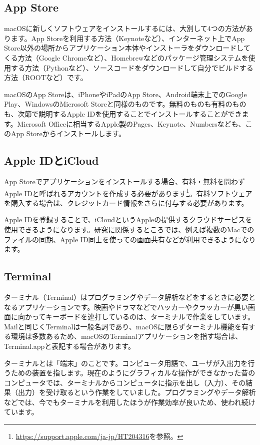 \subsection{App Store}
macOSに新しくソフトウェアをインストールするには、大別して4つの方法があります。App Storeを利用する方法（Keynoteなど）、インターネット上でApp Store以外の場所からアプリケーション本体やインストーラをダウンロードしてくる方法（Google Chromeなど）、Homebrewなどのパッケージ管理システムを使用する方法（Pythonなど）、ソースコードをダウンロードして自分でビルドする方法（ROOTなど）です。

macOSのApp Storeは、iPhoneやiPadのApp Store、Android端末上でのGoogle Play、WindowsのMicrosoft Storeと同様のものです。無料のものも有料のものも、次節で説明するApple IDを使用することでインストールすることができます。Microsoft Officeに相当するApple製のPages、Keynote、Numbersなども、このApp Storeからインストールします。

\subsection{Apple IDとiCloud}

App Storeでアプリケーションをインストールする場合、有料・無料を問わずApple IDと呼ばれるアカウントを作成する必要があります\footnote{\url{https://support.apple.com/ja-jp/HT204316}を参照。}。有料ソフトウェアを購入する場合は、クレジットカード情報をさらに付与する必要があります。

Apple IDを登録することで、iCloudというAppleの提供するクラウドサービスを使用できるようになります。研究に関係するところでは、例えば複数のMacでのファイルの同期、Apple ID同士を使っての画面共有などが利用できるようになります。

\subsection{Terminal}
ターミナル（Terminal）はプログラミングやデータ解析などをするときに必要となるアプリケーションです。映画やドラマなどでハッカーやクラッカーが黒い画面に向かってキーボードを連打しているのは、ターミナルで作業をしています。Mailと同じくTerminalは一般名詞であり、macOSに限らずターミナル機能を有する環境は多数あるため、macOSのTerminalアプリケーションを指す場合は、Terminal.appと表記する場合があります。

ターミナルとは「端末」のことです。コンピュータ用語で、ユーザが入出力を行うための装置を指します。現在のようにグラフィカルな操作ができなかった昔のコンピュータでは、ターミナルからコンピュータに指示を出し（入力）、その結果（出力）を受け取るという作業をしていました。プログラミングやデータ解析などでは、今でもターミナルを利用したほうが作業効率が良いため、使われ続けています。

